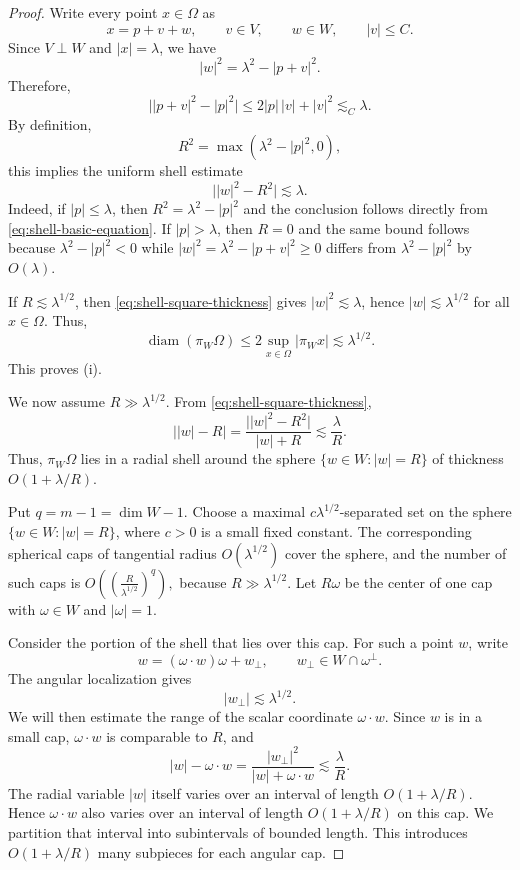\documentclass[10pt,a4paper]{amsart}
\newcommand{\ls}{\lesssim}
\begin{document}
	\begin{proof}
		Write every point $x\in\Omega$ as
		\[
		x=p+v+w,
		\qquad v\in V,
		\qquad w\in W,
		\qquad |v|\le C.
		\]
		Since $V\perp W$ and $|x|=\lambda$, we have
		\begin{equation}\label{eq:shell-basic-equation}
			|w|^2=\lambda^2-|p+v|^2.
		\end{equation}
		Therefore,
		\[
		\bigl||p+v|^2-|p|^2\bigr|
		\le 2|p|\,|v|+|v|^2
		\ls_C \lambda.
		\]
		By definition,
		\[
		R^2=\max(\lambda^2-|p|^2,0),
		\]
		this implies the uniform shell estimate
		\begin{equation}\label{eq:shell-square-thickness}
			\bigl||w|^2-R^2\bigr|\ls\lambda.
		\end{equation}
		Indeed, if $|p|\le\lambda$, then
		$R^2=\lambda^2-|p|^2$ and the conclusion follows directly from
		\eqref{eq:shell-basic-equation}.  If $|p|>\lambda$, then $R=0$ and the same
		bound follows because $\lambda^2-|p|^2<0$ while
		$|w|^2=\lambda^2-|p+v|^2\ge0$ differs from
		$\lambda^2-|p|^2$ by $O(\lambda)$.
		
		If $R\ls\lambda^{1/2}$, then \eqref{eq:shell-square-thickness} gives
		$|w|^2\ls\lambda$, hence $|w|\ls\lambda^{1/2}$ for all $x\in\Omega$.
		Thus,
		\[
		\operatorname{diam}(\pi_W\Omega)
		\le 2\sup_{x\in\Omega}|\pi_Wx|
		\ls\lambda^{1/2}.
		\]
		This proves (i).
		
		We now assume $R\gg\lambda^{1/2}$.  From
		\eqref{eq:shell-square-thickness},
		\[
		\bigl||w|-R\bigr|
		=\frac{\bigl||w|^2-R^2\bigr|}{|w|+R}
		\ls \frac{\lambda}{R}.
		\]
		Thus, $\pi_W\Omega$ lies in a radial shell around the sphere
		$\{w\in W:|w|=R\}$ of thickness $O(1+\lambda/R)$.
		
		Put $q=m-1=\dim W-1$.  Choose a maximal $c\lambda^{1/2}$-separated set on
		the sphere $\{w\in W:|w|=R\}$, where $c>0$ is a small fixed constant. The
		corresponding spherical caps of tangential radius $O(\lambda^{1/2})$ cover
		the sphere, and the number of such caps is
		$	O((\frac{R}{\lambda^{1/2}})^q),$
		because $R\gg\lambda^{1/2}$.  Let $R\omega$ be the center of one cap
		with $\omega\in W$ and $|\omega|=1$.
		
		Consider the portion of the shell that lies over this cap.  For such a point
		$w$, write
		\[
		w=(\omega\cdot w)\omega+w_\perp,
		\qquad w_\perp\in W\cap\omega^\perp.
		\]
		The angular localization gives
		\[
		|w_\perp|\ls\lambda^{1/2}.
		\]
		We will then estimate the range of the scalar coordinate $\omega\cdot w$.  Since
		$w$ is in a small cap, $\omega\cdot w$ is comparable to $R$, and
		\[
		|w|-\omega\cdot w
		=\frac{|w_\perp|^2}{|w|+\omega\cdot w}
		\ls \frac{\lambda}{R}.
		\]
		The radial variable $|w|$ itself varies over an interval of length
		$O(1+\lambda/R)$.  Hence $\omega\cdot w$ also varies over an interval of
		length $O(1+\lambda/R)$
		on this cap.  We partition that interval into subintervals of bounded
		length.  This introduces $O(1+\lambda/R)$ many subpieces for each angular cap.
		

\end{proof}
\end{document}
